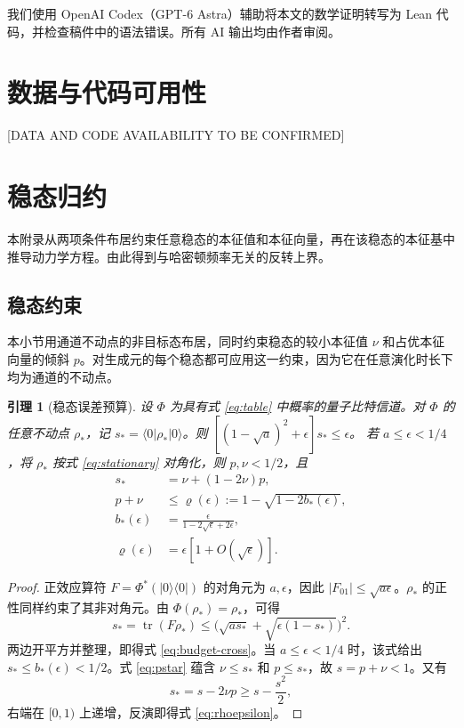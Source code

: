 \documentclass[aps,pra,reprint,amsmath,amssymb,nofootinbib,floatfix,longbibliography]{revtex4-2}
\theoremstyle{aps}
\newtheorem{lemma}[theorem]{引理}
\DeclareMathOperator{\tr}{tr}
\newcommand{\eps}{\epsilon}
\newcommand{\ket}[1]{|#1\rangle}
\newcommand{\bra}[1]{\langle#1|}
\newcommand{\proj}[1]{|#1\rangle\langle#1|}
\begin{document}
\begin{acknowledgments}
我们使用 OpenAI Codex（GPT-6 Astra）辅助将本文的数学证明转写为 Lean 代码，并检查稿件中的语法错误。所有 AI 输出均由作者审阅。
\end{acknowledgments}

\section*{数据与代码可用性}
{ [DATA AND CODE AVAILABILITY TO BE CONFIRMED]\par}

\appendix

\section{稳态归约}\label{app:stationary}\label{sec:comparison}
本附录从两项条件布居约束任意稳态的本征值和本征向量，再在该稳态的本征基中推导动力学方程。由此得到与哈密顿频率无关的反转上界。
\subsection{稳态约束}

本小节用通道不动点的非目标态布居，同时约束稳态的较小本征值 $\nu$ 和占优本征向量的倾斜 $p$。对生成元的每个稳态都可应用这一约束，因为它在任意演化时长下均为通道的不动点。

\begin{lemma}[稳态误差预算]\label{lem:budget}
设 $\Phi$ 为具有式 \eqref{eq:table} 中概率的量子比特信道。对 $\Phi$ 的任意不动点 $\rho_*$，记 $s_* =\bra0\rho_*\ket0$。则 $[(1-\sqrt a)^2+\eps]s_*\le\eps$。
若 $a\le\eps<1/4$，将 $\rho_*$ 按式 \eqref{eq:stationary} 对角化，则 $p,\nu<1/2$，且
\begin{align}
 s_*&=\nu+(1-2\nu)p,\label{eq:pstar}\\
 p+\nu&\le\varrho(\eps):=1-\sqrt{1-2b_*(\eps)},\nonumber\\
 b_*(\eps)&=\frac{\eps}{1-2\sqrt\eps+2\eps},\label{eq:rhoepsilon}\\
 \varrho(\eps)&=\eps[1+O(\sqrt\eps)].\nonumber
\end{align}
\end{lemma}

\begin{proof}
正效应算符 $F=\Phi^*(\proj0)$ 的对角元为 $a,\eps$，因此 $|F_{01}|\le\sqrt{a\eps}$。$\rho_*$ 的正性同样约束了其非对角元。由 $\Phi(\rho_*)=\rho_*$，可得
\[
 s_*=\tr(F\rho_*)
 \le\bigl(\sqrt{as_*}+\sqrt{\eps(1-s_*)}\bigr)^2.
\]
两边开平方并整理，即得式 \eqref{eq:budget-cross}。当 $a\le\eps<1/4$ 时，该式给出 $s_*\le b_*(\eps)<1/2$。式 \eqref{eq:pstar} 蕴含 $\nu\le s_*$ 和 $p\le s_*$，故 $s=p+\nu<1$。又有
\[
 s_*=s-2\nu p\ge s-\frac{s^2}{2},
\]
右端在 $[0,1)$ 上递增，反演即得式 \eqref{eq:rhoepsilon}。
\end{proof}
\end{document}
